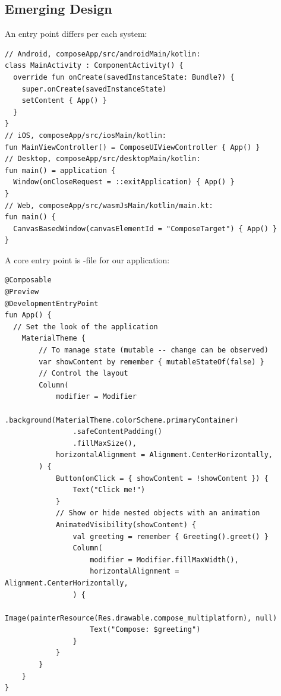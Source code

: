 
\subsection{Emerging Design}

An entry point differs per each system:

\begin{lstlisting}
// Android, composeApp/src/androidMain/kotlin:
class MainActivity : ComponentActivity() {
  override fun onCreate(savedInstanceState: Bundle?) {
    super.onCreate(savedInstanceState)
    setContent { App() }
  }
}
// iOS, composeApp/src/iosMain/kotlin:
fun MainViewController() = ComposeUIViewController { App() }
// Desktop, composeApp/src/desktopMain/kotlin:
fun main() = application {
  Window(onCloseRequest = ::exitApplication) { App() }
}
// Web, composeApp/src/wasmJsMain/kotlin/main.kt:
fun main() {
  CanvasBasedWindow(canvasElementId = "ComposeTarget") { App() }
}
\end{lstlisting}

\noindent A core entry point is -file for our application:

\begin{lstlisting}
@Composable
@Preview
@DevelopmentEntryPoint
fun App() {
  // Set the look of the application
    MaterialTheme {
        // To manage state (mutable -- change can be observed)
        var showContent by remember { mutableStateOf(false) }
        // Control the layout
        Column(
            modifier = Modifier
                .background(MaterialTheme.colorScheme.primaryContainer)
                .safeContentPadding()
                .fillMaxSize(),
            horizontalAlignment = Alignment.CenterHorizontally,
        ) {
            Button(onClick = { showContent = !showContent }) {
                Text("Click me!")
            }
            // Show or hide nested objects with an animation
            AnimatedVisibility(showContent) {
                val greeting = remember { Greeting().greet() }
                Column(
                    modifier = Modifier.fillMaxWidth(),
                    horizontalAlignment = Alignment.CenterHorizontally,
                ) {
                    Image(painterResource(Res.drawable.compose_multiplatform), null)
                    Text("Compose: $greeting")
                }
            }
        }
    }
}
\end{lstlisting}

